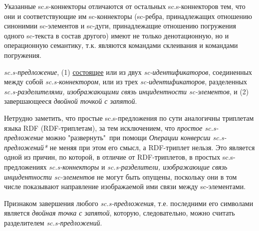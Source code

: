 Указанные sc.s-коннекторы отличаются от остальных sc.s-коннекторов тем, что они и соответствующие им sc-коннекторы (sc-ребра, принадлежащих отношению синонимии sc-элементов и sc-дуги, принадлежащие отношению погружения одного sc-текста в состав другого) имеют не только денотационную, но и операционную семантику, т.к. являются командами склеивания и командами погружения.

\begin{SCn}

\end{SCn}

\textit{sc.s-предложение}, (1) \uline{состоящее} или из двух \textit{sc-идентификаторов}, соединенных между собой \textit{\mbox{sc.s-коннектором}}, или из трех \textit{sc-идентификаторов}, разделенных \textit{sc.s-разделителями, изображающими связь инцидентности sc-элементов}, и (2) завершающееся \textit{двойной точкой с запятой}.

Нетрудно заметить, что простые sc.s-предложения по сути аналогичны триплетам языка RDF (\mbox{RDF-триплетам}), за тем исключением, что \textit{простое sc.s-предложение} можно "развернуть"\ при помощи \textit{Операции конверсии sc.s-предложений*} не меняя при этом его смысл, а RDF-триплет нельзя. Это является одной из причин, по которой, в отличие от RDF-триплетов, в простых \mbox{sc.s-предложениях} \textit{\mbox{sc.s-коннекторы}} и \textit{\mbox{sc.s-разделители}, изображающие связь инцидентности \mbox{sc-элементов}} не могут быть опущены, поскольку они в том числе показывают направление изображаемой ими связи между sc-элементами.

Признаком завершения любого \textit{sc.s-предложения}, т.е. последними его символами является \textit{двойная точка с запятой}, которую, следовательно, можно считать разделителем \textit{sc.s-предложений}.


